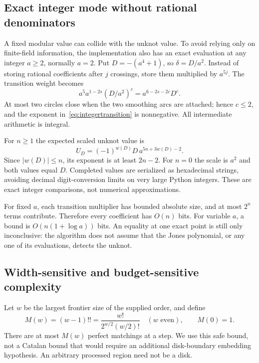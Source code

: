 \documentclass[11pt]{article}
\theoremstyle{remark}\newtheorem{remark}[theorem]{Remark}
\begin{document}
\subsection{Exact integer mode without rational denominators}
A fixed modular value can collide with the unknot value. To avoid relying only
on finite-field information, the implementation also has an exact evaluation
at any integer $a\ge2$, normally $a=2$. Put $D=-(a^4+1)$, so
$\delta=D/a^2$. Instead of storing rational coefficients after $j$ crossings,
store them multiplied by $a^{5j}$. The transition weight becomes
\begin{equation}
 a^5a^{1-2s}(D/a^2)^c=a^{6-2s-2c}D^c.
 \label{eq:integertransition}
\end{equation}
At most two circles close when the two smoothing arcs are attached; hence
$c\le2$, and the exponent in~\eqref{eq:integertransition} is nonnegative.
All intermediate arithmetic is integral.

For $n\ge1$ the expected scaled unknot value is
\begin{equation}
 U_D=(-1)^{w(D)}D\,a^{5n+3w(D)-2}.
 \label{eq:integertarget}
\end{equation}
Since $|w(D)|\le n$, its exponent is at least $2n-2$. For $n=0$ the scale is
$a^2$ and both values equal $D$. Completed values are serialized as hexadecimal
strings, avoiding decimal digit-conversion limits on very large Python
integers. These are exact integer comparisons, not numerical approximations.

For fixed $a$, each transition multiplier has bounded absolute size, and at
most $2^n$ terms contribute. Therefore every coefficient has $O(n)$ bits.
For variable $a$, a bound is $O(n(1+\log a))$ bits. An equality at one exact
point is still only inconclusive: the algorithm does not assume that the
Jones polynomial, or any one of its evaluations, detects the unknot.

\subsection{Width-sensitive and budget-sensitive complexity}
Let $w$ be the largest frontier size of the supplied order, and define
\begin{equation}
 M(w)=(w-1)!!=\frac{w!}{2^{w/2}(w/2)!}\quad(w\text{ even}),\qquad M(0)=1.
 \label{eq:matchingbound}
\end{equation}
There are at most $M(w)$ perfect matchings at a step. We use this safe bound,
not a Catalan bound that would require an additional disk-boundary embedding
hypothesis. An arbitrary processed region need not be a disk.
\end{document}
